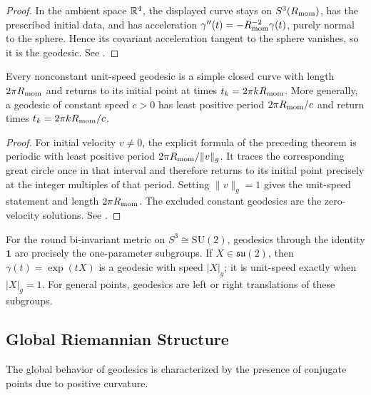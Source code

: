 \documentclass[11pt]{article}
\begin{document}
\begin{proof}
In the ambient space \(\mathbb{R}^4\), the displayed curve stays on \(S^3(R_{\mathrm{mom}})\), has the prescribed initial data, and has acceleration \(\gamma''(t)=-R_{\mathrm{mom}}^{-2}\gamma(t)\), purely normal to the sphere. Hence its covariant acceleration tangent to the sphere vanishes, so it is the geodesic. See \cite{do1992riemannian}.
\end{proof}


\begin{corollary}[Periodicity]
\label{p1a:corollary:atlas-periodicity-62e926f}

Every nonconstant unit-speed geodesic is a simple closed curve with length
$2\pi R_{\mathrm{mom}}$ and returns to its initial point at times
$t_k=2\pi kR_{\mathrm{mom}}$.  More generally, a geodesic of constant speed $c>0$
has least positive period $2\pi R_{\mathrm{mom}}/c$ and return times
$t_k=2\pi kR_{\mathrm{mom}}/c$.
\cite{do1992riemannian}
\end{corollary}

\begin{proof}
For initial velocity $v\ne0$, the explicit formula of the preceding theorem is
periodic with least positive period $2\pi R_{\mathrm{mom}}/\lVert v\rVert_g$.  It traces
the corresponding great circle once in that interval and therefore returns to
its initial point precisely at the integer multiples of that period.  Setting
$\lVert v\rVert_g=1$ gives the unit-speed statement and length
$2\pi R_{\mathrm{mom}}$.  The excluded constant geodesics are the zero-velocity
solutions. See \cite{do1992riemannian}.
\end{proof}


For the round bi-invariant metric on $S^3 \cong \mathrm{SU}(2)$, geodesics through the identity $\mathbf{1}$ are precisely the one-parameter subgroups. If $X \in \mathfrak{su}(2)$, then $\gamma(t)=\exp(tX)$ is a geodesic with speed $|X|_g$; it is unit-speed exactly when $|X|_g=1$. For general points, geodesics are left or right translations of these subgroups.

\subsection{Global Riemannian Structure}

The global behavior of geodesics is characterized by the presence of conjugate points due to positive curvature.
\end{document}
